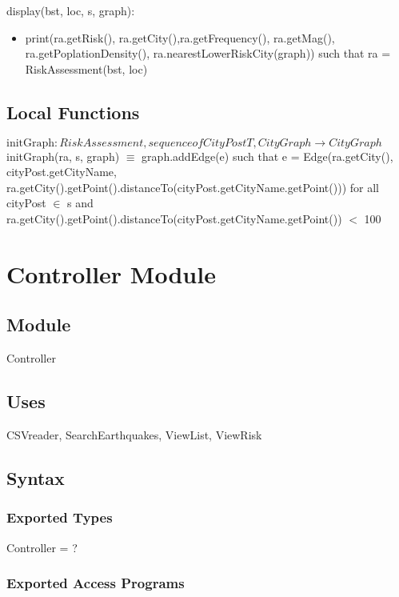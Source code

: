 \documentclass[12pt]{article}
\begin{document}
\noindent display(bst, loc, s, graph):
\begin{itemize}
\item print(ra.getRisk(), ra.getCity(),ra.getFrequency(), ra.getMag(), ra.getPoplationDensity(), ra.nearestLowerRiskCity(graph)) such that ra = RiskAssessment(bst, loc)\\
\end{itemize}

\subsection*{Local Functions}
\noindent $\text{initGraph}: RiskAssessment, sequence of CityPostT, CityGraph \rightarrow CityGraph$\\
\noindent initGraph(ra, s, graph) $\equiv$ graph.addEdge(e) such that e = Edge(ra.getCity(), cityPost.getCityName, ra.getCity().getPoint().distanceTo(cityPost.getCityName.getPoint())) for all cityPost $\in$ s and ra.getCity().getPoint().distanceTo(cityPost.getCityName.getPoint()) $<$ 100\\




\newpage

\section* {Controller Module}

\subsection* {Module}

Controller

\subsection* {Uses}

CSVreader, SearchEarthquakes, ViewList, ViewRisk

\subsection* {Syntax}

\subsubsection* {Exported Types}

Controller = ?

\subsubsection* {Exported Access Programs}
\end{document}
